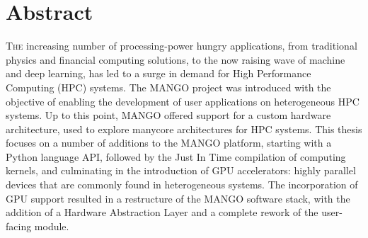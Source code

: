 \chapter*{Abstract}
\lettrine{T}{he} increasing number of processing-power hungry applications, from traditional physics and financial computing solutions, to the now raising wave of machine and deep learning, has led to a surge in demand for High Performance Computing (HPC) systems.
The MANGO project was introduced with the objective of enabling the development of user applications on heterogeneous HPC systems.
Up to this point, MANGO offered support for a custom hardware architecture, used to explore manycore architectures for HPC systems.
This thesis focuses on a number of additions to the MANGO platform, starting with a Python language API, followed by the Just In Time compilation of computing kernels, and culminating in the introduction of GPU accelerators: highly parallel devices that are commonly found in heterogeneous systems. 
The incorporation of GPU support resulted in a restructure of the MANGO software stack, with the addition of a Hardware Abstraction Layer and a complete rework of the user-facing module.


